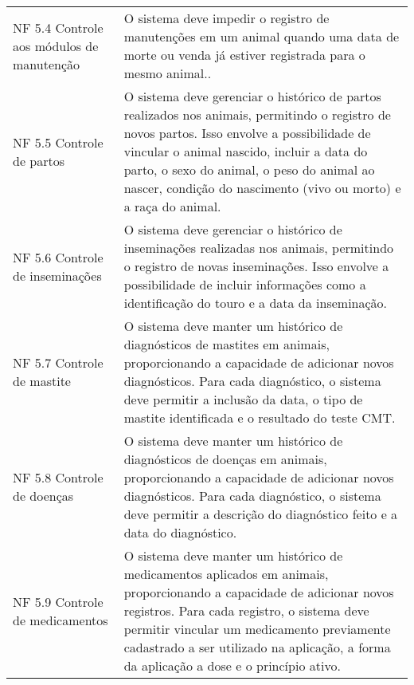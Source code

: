 \begin{tabframed}[htb]
\begin{tabular}{|l|l|}
    NF 5.4 Controle aos módulos de manutenção &
    \multicolumn{1}{|p{8cm}|}{\raggedright O sistema deve impedir o registro de manutenções em um animal quando uma data de morte ou venda já estiver registrada para o mesmo animal..}
    \\ \cline{1-2}

    NF 5.5 Controle de partos                 &
    \multicolumn{1}{|p{8cm}|}{\raggedright O sistema deve gerenciar o histórico de partos realizados nos animais, permitindo o registro de novos partos. Isso envolve a possibilidade de vincular o animal nascido, incluir a data do parto, o sexo do animal, o peso do animal ao nascer, condição do nascimento (vivo ou morto) e a raça do animal.}
    \\ \cline{1-2}

    NF 5.6 Controle de inseminações           &
    \multicolumn{1}{|p{8cm}|}{\raggedright O sistema deve gerenciar o histórico de inseminações realizadas nos animais, permitindo o registro de novas inseminações. Isso envolve a possibilidade de incluir informações como a identificação do touro e a data da inseminação.}
    \\ \cline{1-2}

    NF 5.7 Controle de mastite                &
    \multicolumn{1}{|p{8cm}|}{\raggedright O sistema deve manter um histórico de diagnósticos de mastites em animais, proporcionando a capacidade de adicionar novos diagnósticos. Para cada diagnóstico, o sistema deve permitir a inclusão da data, o tipo de mastite identificada e o resultado do teste CMT.}
    \\ \cline{1-2}

    NF 5.8 Controle de doenças                &
    \multicolumn{1}{|p{8cm}|}{\raggedright O sistema deve manter um histórico de diagnósticos de doenças em animais, proporcionando a capacidade de adicionar novos diagnósticos. Para cada diagnóstico, o sistema deve permitir a descrição do diagnóstico feito e a data do diagnóstico.}
    \\ \cline{1-2}

    NF 5.9 Controle de medicamentos           &
    \multicolumn{1}{|p{8cm}|}{\raggedright O sistema deve manter um histórico de medicamentos aplicados em animais, proporcionando a capacidade de adicionar novos registros. Para cada registro, o sistema deve permitir vincular um medicamento previamente cadastrado a ser utilizado na aplicação, a forma da aplicação a dose e o princípio ativo.}
    \\ \cline{1-2}


\end{tabular}
\end{tabframed}
